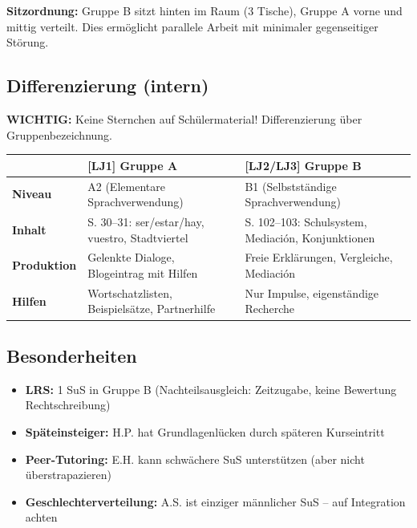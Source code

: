 \documentclass[11pt,a4paper]{article}
\begin{document}
\vspace{0.5em}
\textbf{Sitzordnung:} Gruppe B sitzt hinten im Raum (3 Tische), Gruppe A vorne und mittig verteilt. Dies ermöglicht parallele Arbeit mit minimaler gegenseitiger Störung.

\subsection{Differenzierung (intern)}

\textbf{WICHTIG:} Keine Sternchen auf Schülermaterial! Differenzierung über Gruppenbezeichnung.

\begin{tabular}{|l|p{5cm}|p{5cm}|}
\hline
& \textbf{[LJ1] Gruppe A} & \textbf{[LJ2/LJ3] Gruppe B} \\
\hline
\textbf{Niveau} & A2 (Elementare Sprachverwendung) & B1 (Selbstständige Sprachverwendung) \\
\hline
\textbf{Inhalt} & S. 30--31: ser/estar/hay, vuestro, Stadtviertel & S. 102--103: Schulsystem, Mediación, Konjunktionen \\
\hline
\textbf{Produktion} & Gelenkte Dialoge, Blogeintrag mit Hilfen & Freie Erklärungen, Vergleiche, Mediación \\
\hline
\textbf{Hilfen} & Wortschatzlisten, Beispielsätze, Partnerhilfe & Nur Impulse, eigenständige Recherche \\
\hline
\end{tabular}

\subsection{Besonderheiten}
\begin{itemize}
    \item \textbf{LRS:} 1 SuS in Gruppe B (Nachteilsausgleich: Zeitzugabe, keine Bewertung Rechtschreibung)
    \item \textbf{Späteinsteiger:} H.P. hat Grundlagenlücken durch späteren Kurseintritt
    \item \textbf{Peer-Tutoring:} E.H. kann schwächere SuS unterstützen (aber nicht überstrapazieren)
    \item \textbf{Geschlechterverteilung:} A.S. ist einziger männlicher SuS -- auf Integration achten
\end{itemize}

\end{document}
